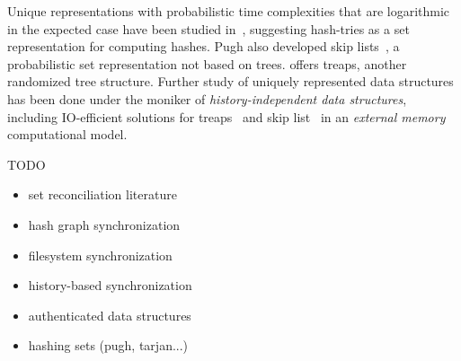 Unique representations with probabilistic time complexities that are logarithmic in the expected case have been studied in~\cite{pugh1989incremental}, suggesting hash-tries as a set representation for computing hashes. Pugh also developed skip lists~\cite{pugh1990skip}, a probabilistic set representation not based on trees. \cite{seidel1996randomized} offers treaps, another randomized tree structure. Further study of uniquely represented data structures has been done under the moniker of \textit{history-independent data structures}, including IO-efficient solutions for treaps~\cite{golovin2009b} and skip list~\cite{bender2016anti} in an \textit{external memory} computational model.

TODO

\begin{itemize}
  \item set reconciliation literature
  \item hash graph synchronization
  \item filesystem synchronization
  \item history-based synchronization
  \item authenticated data structures
  \item hashing sets (pugh, tarjan...)
\end{itemize}

